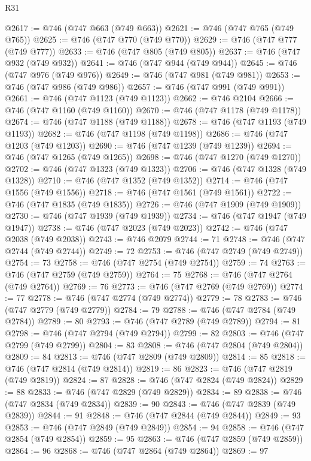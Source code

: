 \begin{lexlean}{R31}
\begin{coremodule}
@2617 := @746 (@747 @663 (@749 @663))
@2621 := @746 (@747 @765 (@749 @765))
@2625 := @746 (@747 @770 (@749 @770))
@2629 := @746 (@747 @777 (@749 @777))
@2633 := @746 (@747 @805 (@749 @805))
@2637 := @746 (@747 @932 (@749 @932))
@2641 := @746 (@747 @944 (@749 @944))
@2645 := @746 (@747 @976 (@749 @976))
@2649 := @746 (@747 @981 (@749 @981))
@2653 := @746 (@747 @986 (@749 @986))
@2657 := @746 (@747 @991 (@749 @991))
@2661 := @746 (@747 @1123 (@749 @1123))
@2662 := @746 @2104
@2666 := @746 (@747 @1160 (@749 @1160))
@2670 := @746 (@747 @1178 (@749 @1178))
@2674 := @746 (@747 @1188 (@749 @1188))
@2678 := @746 (@747 @1193 (@749 @1193))
@2682 := @746 (@747 @1198 (@749 @1198))
@2686 := @746 (@747 @1203 (@749 @1203))
@2690 := @746 (@747 @1239 (@749 @1239))
@2694 := @746 (@747 @1265 (@749 @1265))
@2698 := @746 (@747 @1270 (@749 @1270))
@2702 := @746 (@747 @1323 (@749 @1323))
@2706 := @746 (@747 @1328 (@749 @1328))
@2710 := @746 (@747 @1352 (@749 @1352))
@2714 := @746 (@747 @1556 (@749 @1556))
@2718 := @746 (@747 @1561 (@749 @1561))
@2722 := @746 (@747 @1835 (@749 @1835))
@2726 := @746 (@747 @1909 (@749 @1909))
@2730 := @746 (@747 @1939 (@749 @1939))
@2734 := @746 (@747 @1947 (@749 @1947))
@2738 := @746 (@747 @2023 (@749 @2023))
@2742 := @746 (@747 @2038 (@749 @2038))
@2743 := @746 @2079
@2744 := 71
@2748 := @746 (@747 @2744 (@749 @2744))
@2749 := 72
@2753 := @746 (@747 @2749 (@749 @2749))
@2754 := 73
@2758 := @746 (@747 @2754 (@749 @2754))
@2759 := 74
@2763 := @746 (@747 @2759 (@749 @2759))
@2764 := 75
@2768 := @746 (@747 @2764 (@749 @2764))
@2769 := 76
@2773 := @746 (@747 @2769 (@749 @2769))
@2774 := 77
@2778 := @746 (@747 @2774 (@749 @2774))
@2779 := 78
@2783 := @746 (@747 @2779 (@749 @2779))
@2784 := 79
@2788 := @746 (@747 @2784 (@749 @2784))
@2789 := 80
@2793 := @746 (@747 @2789 (@749 @2789))
@2794 := 81
@2798 := @746 (@747 @2794 (@749 @2794))
@2799 := 82
@2803 := @746 (@747 @2799 (@749 @2799))
@2804 := 83
@2808 := @746 (@747 @2804 (@749 @2804))
@2809 := 84
@2813 := @746 (@747 @2809 (@749 @2809))
@2814 := 85
@2818 := @746 (@747 @2814 (@749 @2814))
@2819 := 86
@2823 := @746 (@747 @2819 (@749 @2819))
@2824 := 87
@2828 := @746 (@747 @2824 (@749 @2824))
@2829 := 88
@2833 := @746 (@747 @2829 (@749 @2829))
@2834 := 89
@2838 := @746 (@747 @2834 (@749 @2834))
@2839 := 90
@2843 := @746 (@747 @2839 (@749 @2839))
@2844 := 91
@2848 := @746 (@747 @2844 (@749 @2844))
@2849 := 93
@2853 := @746 (@747 @2849 (@749 @2849))
@2854 := 94
@2858 := @746 (@747 @2854 (@749 @2854))
@2859 := 95
@2863 := @746 (@747 @2859 (@749 @2859))
@2864 := 96
@2868 := @746 (@747 @2864 (@749 @2864))
@2869 := 97

\end{coremodule}
\end{lexlean}
